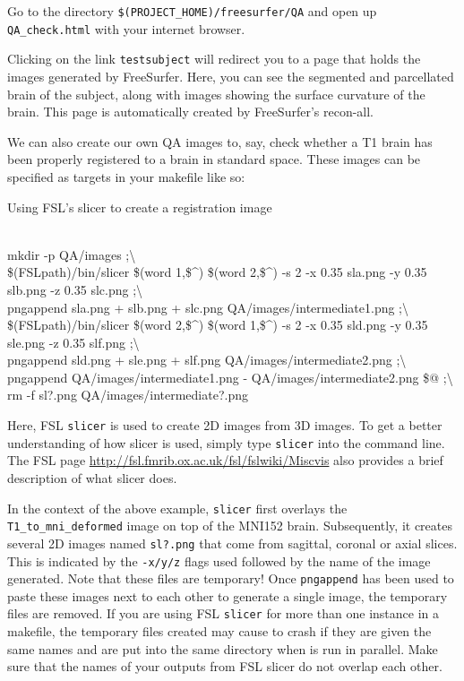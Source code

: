 Go to the directory \texttt{\$(PROJECT_HOME)/freesurfer/QA} and open up \texttt{QA_check.html} with your internet browser. 

Clicking on the link \texttt{testsubject} will redirect you to a page that holds the images generated by FreeSurfer. Here, you can see the segmented and parcellated brain of the subject, along with images showing the surface curvature of the brain. This page is automatically created by FreeSurfer's recon-all.

We can also create our own QA images to, say, check whether a T1 brain has been properly registered to a brain in standard space. These images can be specified as targets in your makefile like so: 
\clearpage
\begin{make}{Using FSL's slicer to create a registration image}{}

 \\
\tab mkdir -p QA/images ;\textbackslash{} \\
\tab\$(FSLpath)/bin/slicer \$(word 1,\$\textasciicircum{}) \$(word 2,\$\textasciicircum{}) -s 2 -x 0.35 sla.png -y 0.35 slb.png -z 0.35 slc.png ;\textbackslash{} \\
\tab pngappend sla.png + slb.png + slc.png QA/images/intermediate1.png ;\textbackslash{} \\
\tab\$(FSLpath)/bin/slicer \$(word 2,\$\textasciicircum{}) \$(word 1,\$\textasciicircum{}) -s 2 -x 0.35 sld.png -y 0.35 sle.png -z 0.35 slf.png ;\textbackslash{} \\
\tab pngappend sld.png + sle.png + slf.png QA/images/intermediate2.png ;\textbackslash{} \\
\tab pngappend QA/images/intermediate1.png - QA/images/intermediate2.png \$@ ;\textbackslash{} \\
\tab rm -f sl?.png QA/images/intermediate?.png
\end{make}

Here, FSL \texttt{slicer} is used to create 2D images from 3D images. To get a better understanding of how slicer is used, simply type \texttt{slicer} into the command line. The FSL page \url{http://fsl.fmrib.ox.ac.uk/fsl/fslwiki/Miscvis} also provides a brief description of what slicer does. 

In the context of the above example, \texttt{slicer} first overlays the \texttt{T1_to_mni_deformed} image on top of the MNI152 brain. Subsequently, it creates several 2D images named \texttt{sl?.png} that come from sagittal, coronal or axial slices. This is indicated by the \texttt{-x/y/z} flags used followed by the name of the image generated. Note that these files are temporary! Once \texttt{pngappend} has been used to paste these images next to each other to generate a single image, the temporary files are removed. If you are using FSL \texttt{slicer} for more than one instance in a makefile, the temporary files created may cause \maken{} to crash if they are given the same names and are put into the same directory when \maken{} is run in parallel. Make sure that the names of your outputs from FSL slicer do not overlap each other. 

